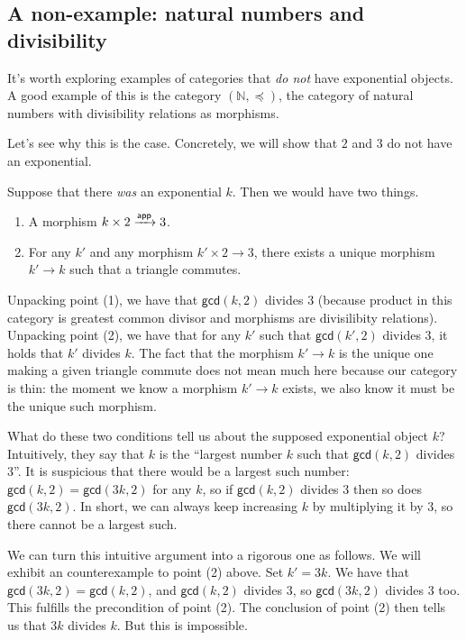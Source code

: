 \subsection{A non-example: natural numbers and divisibility}
It's worth exploring examples of categories that \emph{do not}
have exponential objects. A good example of this 
is the category $(\mathbb{N}, \preceq)$, the category of 
natural numbers with divisibility relations as morphisms.

Let's see why this is the case.
Concretely, we will show that \(2\) and \(3\)
do not have an exponential.

Suppose that there \emph{was} an exponential \(k\).
Then we would have two things.
\begin{enumerate}
\item A morphism \(k \times 2 \xrightarrow{\mathsf{app}} 3\).
\item For any \(k'\)
and any morphism \(k' \times 2 \to 3\),
there exists a unique morphism \(k' \to k\) such that
a triangle commutes.
\end{enumerate}
Unpacking point (1),
we have that \(\mathsf{gcd}(k,2)\) divides \(3\) (because product in this
category is greatest common divisor and morphisms are divisilibity relations).
Unpacking point (2), we have that for any \(k'\) such that \(\mathsf{gcd}(k',2)\) divides \(3\),
it holds that \(k'\) divides \(k\). The fact that the morphism \(k' \to k\)
is the unique one making a given triangle commute does not mean much here because our category
is thin: the moment we know a morphism \(k' \to k\) exists, we also know it must be the unique
such morphism.

What do these two conditions tell us about the supposed exponential object \(k\)?
Intuitively, they say that \(k\) is the ``largest number \(k\) such that \(\mathsf{gcd}(k,2)\) divides \(3\)''.
It is suspicious that there would be a largest such number: \(\mathsf{gcd}(k,2) = \mathsf{gcd}(3k,2)\)
for any \(k\), so if \(\mathsf{gcd}(k,2)\) divides \(3\) then so does \(\mathsf{gcd}(3k,2)\).
In short, we can always keep increasing \(k\) by multiplying it by \(3\), so there cannot be a largest such.

We can turn this intuitive argument into a rigorous one as follows.
We will exhibit an counterexample to point (2) above. Set \(k' = 3k\).
We have that \(\mathsf{gcd}(3k,2) = \mathsf{gcd}(k,2)\), and \(\mathsf{gcd}(k,2)\) divides \(3\),
so \(\mathsf{gcd}(3k,2)\) divides \(3\) too. This fulfills the precondition of point (2).
The conclusion of point (2) then tells us that
\(3k\) divides \(k\). But this is impossible.

